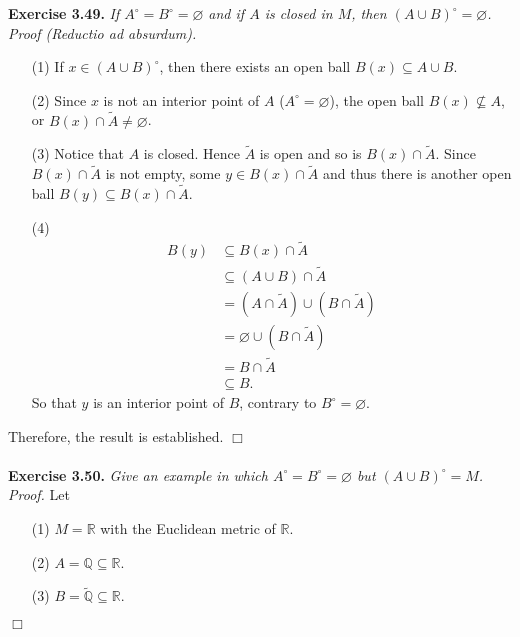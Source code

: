 \documentclass{article}
\begin{document}



\textbf{Exercise 3.49.}
\emph{If $A^{\circ} = B^{\circ} = \varnothing$ and if $A$ is closed in $M$,
then $(A \cup B)^{\circ} = \varnothing$. } \\

\emph{Proof (Reductio ad absurdum).}
\begin{enumerate}
\item[(1)]
If $x \in (A \cup B)^{\circ}$, then there exists an open ball $B(x) \subseteq A \cup B$.
\item[(2)]
Since $x$ is not an interior point of $A$ ($A^{\circ} = \varnothing$),
the open ball $B(x) \not\subseteq A$, or $B(x) \cap \widetilde{A} \neq \varnothing$.
\item[(3)]
Notice that $A$ is closed.
Hence $\widetilde{A}$ is open and so is $B(x) \cap \widetilde{A}$.
Since $B(x) \cap \widetilde{A}$ is not empty,
some $y \in B(x) \cap \widetilde{A}$ and thus
there is another open ball $B(y) \subseteq B(x) \cap \widetilde{A}$.
\item[(4)]
\begin{align*}
B(y)
&\subseteq B(x) \cap \widetilde{A} \\
&\subseteq (A \cup B) \cap \widetilde{A} \\
&= (A \cap \widetilde{A}) \cup (B \cap \widetilde{A}) \\
&= \varnothing \cup (B \cap \widetilde{A}) \\
&= B \cap \widetilde{A} \\
&\subseteq B.
\end{align*}
So that $y$ is an interior point of $B$, contrary to $B^{\circ} = \varnothing$.
\end{enumerate}
Therefore, the result is established.
$\Box$ \\\\






\textbf{Exercise 3.50.}
\emph{Give an example in which $A^{\circ} = B^{\circ} = \varnothing$ but
$(A \cup B)^{\circ} = M$. } \\

\emph{Proof.}
Let
\begin{enumerate}
\item[(1)]
$M = \mathbb{R}$ with the Euclidean metric of $\mathbb{R}$.
\item[(2)]
$A = \mathbb{Q} \subseteq \mathbb{R}$.
\item[(3)]
$B = \widetilde{\mathbb{Q}} \subseteq \mathbb{R}$.
\end{enumerate}
$\Box$ \\\\
\end{document}
